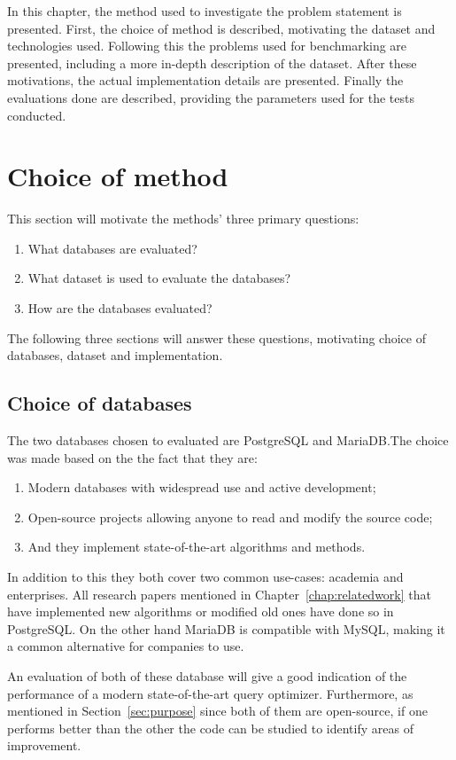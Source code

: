 In this chapter, the method used to investigate the problem statement is
presented. First, the choice of method is described, motivating the dataset and
technologies used. Following this the problems used for benchmarking are
presented, including a more in-depth description of the dataset. After these
motivations, the actual implementation details are presented. Finally the
evaluations done are described, providing the parameters used for the tests
conducted.

\section{Choice of method}\label{sec:choiceofmethod}
This section will motivate the methods' three primary questions:
\begin{enumerate}
\item What databases are evaluated?
\item What dataset is used to evaluate the databases?
\item How are the databases evaluated?
\end{enumerate}

The following three sections will answer these questions, motivating
choice of databases, dataset and implementation.

\subsection{Choice of databases}\label{sec:choiceofdatabases}
The two databases chosen to evaluated are PostgreSQL and MariaDB.\@ The choice was
made based on the the fact that they are:
\begin{enumerate}
\item Modern databases with widespread use and active development;
\item Open-source projects allowing anyone to read and modify the source code;
\item And they implement state-of-the-art algorithms and methods.
\end{enumerate}

In addition to this they both cover two common use-cases: academia and
enterprises. All research papers mentioned in Chapter~\ref{chap:relatedwork} that have
implemented new algorithms or modified old ones have done so in PostgreSQL.\@
On the other hand MariaDB is compatible with MySQL, making it a common
alternative for companies to use.

An evaluation of both of these database will give a good indication of the
performance of a modern state-of-the-art query optimizer. Furthermore, as
mentioned in Section~\ref{sec:purpose} since both of them are open-source, if
one performs better than the other the code can be studied to identify areas of
improvement.

